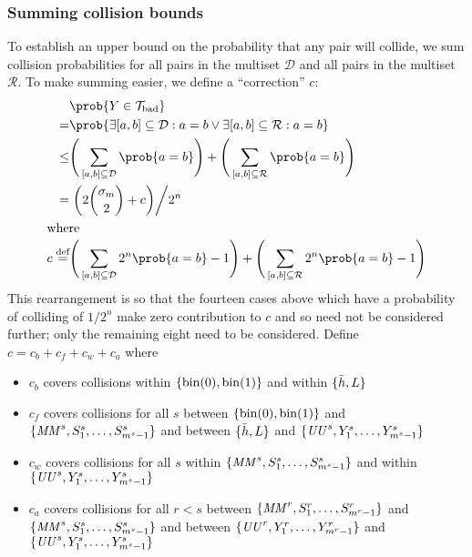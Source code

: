 \documentclass[hctr2.tex]{subfiles}
\begin{document}
\subsubsection{Summing collision bounds}
To establish an upper bound on the probability that any pair will collide,
we sum collision probabilities
for all pairs in the multiset \(\mathcal{D}\)
and all pairs in the multiset \(\mathcal{R}\).
To make summing easier, we define a ``correction'' \(c\):
\begin{align*}
    & \prob{Y \in \Tb} \\
    = &\prob{\exists [a, b] \subseteq \mathcal{D}: a = b \vee \exists [a, b] \subseteq \mathcal{R} : a = b} \\
    \leq &
        \Bigg(\sum_{[a, b] \subseteq \mathcal{D}} \prob{a = b}\Bigg)
      + \Bigg(\sum_{[a, b] \subseteq \mathcal{R}} \prob{a = b}\Bigg)
      \\
    = &\left.\left(2\binom{\sigma_m}{2} + c
    \right)\middle/2^n\right. \\
    \intertext{where}
    c \defeq &
    \Bigg(\sum_{[a, b] \subseteq \mathcal{D}} 2^n\prob{a = b} -1\Bigg)
    + \Bigg(\sum_{[a, b] \subseteq \mathcal{R}} 2^n\prob{a = b} -1\Bigg)
\end{align*}
This rearrangement is so that the fourteen cases above
which have a probability of colliding of \(1/2^n\)
make zero contribution to \(c\)
and so need not be considered further;
only the remaining eight
need to be considered. Define
\(c = c_b + c_f + c_w + c_a\) where
\begin{itemize}
    \item \(c_b\) covers collisions within 
    \(\{\operatorname{bin}(0), \operatorname{bin}(1)\}\) and within \(\{\bar{h}, L\}\)
    \item \(c_f\) covers collisions
    for all \(s\)
    between \(\{\operatorname{bin}(0), \operatorname{bin}(1)\}\) and \(\{\mathit{MM}^s, S_1^s, \ldots, S_{m^s-1}^s\}\)
    and between \(\{\bar{h}, L\}\) and \(\{\mathit{UU}^s, Y_1^s, \ldots, Y_{m^s-1}^s\}\)
    \item \(c_w\) covers collisions
    for all \(s\)
    within \(\{\mathit{MM}^s, S_1^s, \ldots, S_{m^s-1}^s\}\)
    and within \(\{\mathit{UU}^s, Y_1^s, \ldots, Y_{m^s-1}^s\}\)
    \item \(c_a\) covers collisions
    for all \(r < s\)
    between \(\{\mathit{MM}^r, S_1^r, \ldots, S_{m^r-1}^r\}\) and \(\{\mathit{MM}^s, S_1^s, \ldots, S_{m^s-1}^s\}\)
    and between \(\{\mathit{UU}^r, Y_1^r, \ldots, Y_{m^r-1}^r\}\) and \(\{\mathit{UU}^s, Y_1^s, \ldots, Y_{m^s-1}^s\}\)
\end{itemize}
\end{document}
